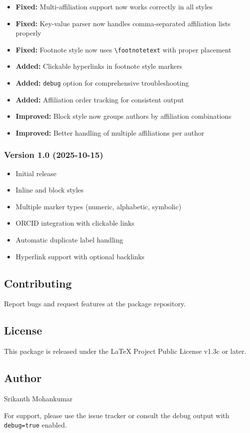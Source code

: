 \documentclass[
]{article}
\providecommand{\tightlist}{%
  \setlength{\itemsep}{0pt}\setlength{\parskip}{0pt}}
\begin{document}
\begin{itemize}
\tightlist
\item
  \textbf{Fixed:} Multi-affiliation support now works correctly in all
  styles
\item
  \textbf{Fixed:} Key-value parser now handles comma-separated
  affiliation lists properly
\item
  \textbf{Fixed:} Footnote style now uses
  \texttt{\textbackslash{}footnotetext} with proper placement
\item
  \textbf{Added:} Clickable hyperlinks in footnote style markers
\item
  \textbf{Added:} \texttt{debug} option for comprehensive
  troubleshooting
\item
  \textbf{Added:} Affiliation order tracking for consistent output
\item
  \textbf{Improved:} Block style now groups authors by affiliation
  combinations
\item
  \textbf{Improved:} Better handling of multiple affiliations per author
\end{itemize}

\hypertarget{version-1.0-2025-10-15}{%
\subsubsection{Version 1.0 (2025-10-15)}\label{version-1.0-2025-10-15}}

\begin{itemize}
\tightlist
\item
  Initial release
\item
  Inline and block styles
\item
  Multiple marker types (numeric, alphabetic, symbolic)
\item
  ORCID integration with clickable links
\item
  Automatic duplicate label handling
\item
  Hyperlink support with optional backlinks
\end{itemize}

\hypertarget{contributing}{%
\subsection{Contributing}\label{contributing}}

Report bugs and request features at the package repository.

\hypertarget{license}{%
\subsection{License}\label{license}}

This package is released under the LaTeX Project Public License v1.3c or
later.

\hypertarget{author}{%
\subsection{Author}\label{author}}

Srikanth Mohankumar

For support, please use the issue tracker or consult the debug output
with \texttt{debug=true} enabled.
\end{document}
